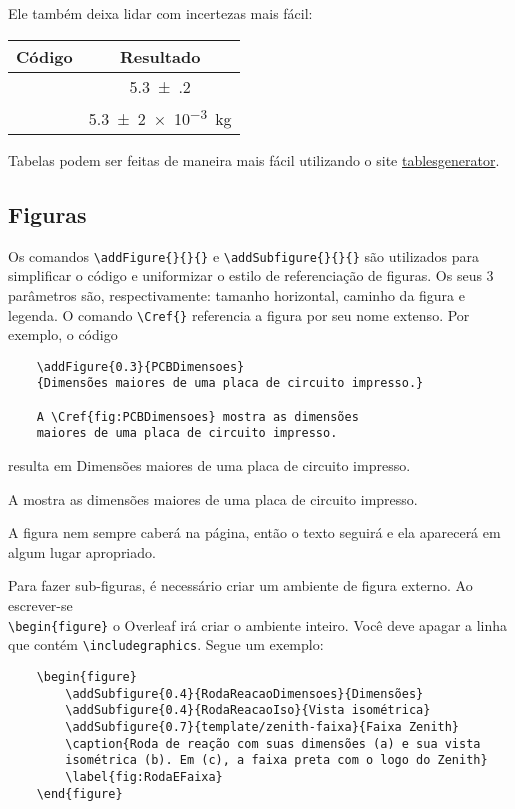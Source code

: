 \documentclass[brazilian, 11pt, oneside, a4paper]{article}
\newcommand{\codeandmath}[1]{%
    \mbox{\ttfamily \detokenize{#1}} & \mbox{#1}
}
\begin{document}
Ele também deixa lidar com incertezas mais fácil:
\begin{table}[h]
\centering
\begin{tabular}{cc}
\toprule
    Código & Resultado \\ \midrule
    \codeandmath{\num{5.3(2)}} \\  
    \codeandmath{\SI{5.3+-2e-3}{kg}} \\ \bottomrule
\end{tabular}
\end{table}

Tabelas podem ser feitas de maneira mais fácil utilizando o site \href{https://www.tablesgenerator.com/}{tablesgenerator}.

\subsection{Figuras} 

Os comandos \verb$\addFigure{}{}{}$ e \verb$\addSubfigure{}{}{}$ são utilizados para simplificar o código e uniformizar o estilo de referenciação de figuras. Os seus 3 parâmetros são, respectivamente: tamanho horizontal, caminho da figura e legenda. O comando \verb$\Cref{}$ referencia a figura por seu nome extenso.
Por exemplo, o código
\begin{verbatim}
    \addFigure{0.3}{PCBDimensoes}
    {Dimensões maiores de uma placa de circuito impresso.}
    
    A \Cref{fig:PCBDimensoes} mostra as dimensões
    maiores de uma placa de circuito impresso.
\end{verbatim}
resulta em 
{Dimensões maiores de uma placa de circuito impresso.}
    
A  mostra as dimensões
maiores de uma placa de circuito impresso.

A figura nem sempre caberá na página, então o texto seguirá e ela aparecerá em algum lugar apropriado. 

Para fazer sub-figuras, é necessário criar um ambiente de figura externo. Ao escrever-se \\ \verb$\begin{figure}$ o Overleaf irá criar o ambiente inteiro. Você deve apagar a linha que contém \verb$\includegraphics$. Segue um exemplo:
{\small
\begin{verbatim}
    \begin{figure}
        \addSubfigure{0.4}{RodaReacaoDimensoes}{Dimensões}
        \addSubfigure{0.4}{RodaReacaoIso}{Vista isométrica}
        \addSubfigure{0.7}{template/zenith-faixa}{Faixa Zenith}
        \caption{Roda de reação com suas dimensões (a) e sua vista 
        isométrica (b). Em (c), a faixa preta com o logo do Zenith}
        \label{fig:RodaEFaixa}
    \end{figure}
\end{verbatim}
}
\end{document}
